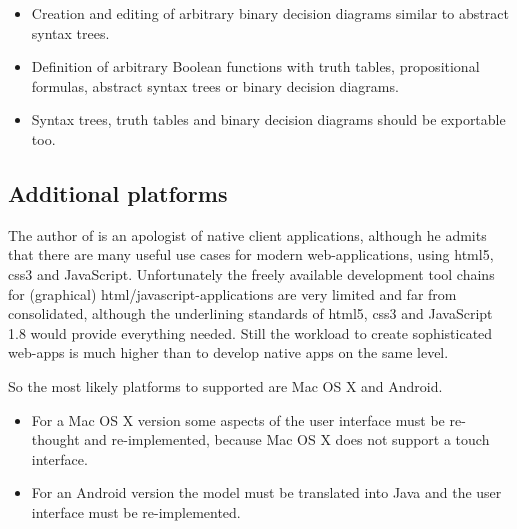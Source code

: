 \begin{itemize}

\item Creation and editing of arbitrary binary decision diagrams similar to abstract syntax trees.

\item Definition of arbitrary Boolean functions with truth tables, propositional formulas, abstract syntax trees or binary decision diagrams.

\item Syntax trees, truth tables and binary decision diagrams should be exportable too.

\end{itemize}


\subsection{Additional platforms}

The author of \Nyaya is an apologist of native client applications,
although he admits that there are many useful use cases for modern web-applications, 
using html5, css3 and JavaScript. 
Unfortunately the freely available development tool chains for (graphical) html/javascript-applications
are very limited and far from consolidated, although the underlining standards of html5, css3 
and JavaScript 1.8 would provide everything needed.
Still the workload to create sophisticated web-apps 
is much higher than to develop native apps on the same level.

So the most likely platforms to supported \Nyaya are Mac OS X and Android.

\begin{itemize}
\item
For a Mac OS X version some aspects of the user interface must be re-thought and re-implemented, 
because Mac OS X does not support a touch interface.
\item
For an Android version the model must be translated into Java and the user interface must be re-implemented.
\end{itemize}

